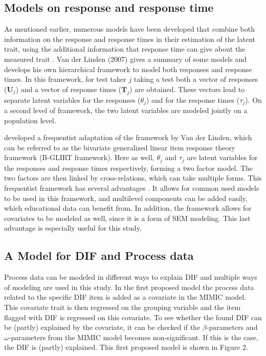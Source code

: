 \documentclass{article}
\begin{document}
\subsection*{Models on response and response time}
As mentioned earlier, numerous models have been developed that combine both information on the response and response times in their estimation of the latent trait, using the additional information that response time can give about the measured trait  \parencite{van2007hierarchical, entink2009statistical, molenaar2015generalized}. Van der Linden (2007) gives a summary of some models and develops his own hierarchical framework to model both responses and response times. In this framework, for test taker $j$ taking a test both a vector of responses ($\textbf{U}_j$) and a vector of response times ($\textbf{T}_j$) are obtained. These vectors lead to separate latent variables for the responses ($\theta_j$) and for the response times ($\tau_j$). On a second level of framework, the two latent variables are modeled jointly on a population level. 

\textcite{molenaar2015generalized} developed a frequentist adaptation of the framework by Van der Linden, which can be referred to as the bivariate generalized linear item response theory framework (B-GLIRT framework). Here as well, $\theta_j$ and $\tau_j$ are latent variables for the responses and response times respectively, forming a two factor model. The two factors are then linked by cross-relations, which can take multiple forms. This frequentist framework has several advantages \parencite{molenaar2015generalized}. It allows for common used models to be used in this framework, and multilevel components can be added easily, which educational data can benefit from.  In addition, the framework allows for covariates to be modeled as well, since it is a form of SEM modeling. This last advantage is especially useful for this study. 

\subsection*{A Model for DIF and Process data}
Process data can be modeled in different ways to explain DIF and multiple ways of modeling are used in this study. In the first proposed model the process data related to the specific DIF item is added as a covariate in the MIMIC model. This covariate trait is then regressed on the grouping variable and the item flagged with DIF is regressed on this covariate. To see whether the found DIF can be (partly) explained by the covariate, it can be checked if the $\beta$-parameters and $\omega$-parameters from the MIMIC model becomes non-significant. If this is the case, the DIF is (partly) explained. This first proposed model is shown in Figure 2.
\end{document}
